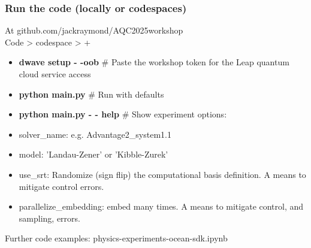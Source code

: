 \documentclass[aspectratio=169,final,11pt,forpublic]{beamer} %
\begin{document}
%
%  
%
%        



\begin{frame}\frametitle{\bf Run the code (locally or codespaces)}
  At github.com/jackraymond/AQC2025workshop \\
  Code > codespace > +\\
  \begin{itemize}
    \item[] {\bf dwave setup - -oob}  \# Paste the workshop token for the Leap quantum cloud service access
    \item[] {\bf python main.py}  \# Run with defaults
    \item[] {\bf python main.py - - help}  \# Show experiment options:
  \end{itemize}

  \begin{itemize}
  \item solver\_name: e.g. Advantage2\_system1.1
  \item model: 'Landau-Zener' or 'Kibble-Zurek'
  \item use\_srt: Randomize (sign flip) the computational basis definition. A means to mitigate control errors.
  \item parallelize\_embedding: embed many times. A means to mitigate control, and sampling, errors. 
  \end{itemize}
  Further code examples: physics-experiments-ocean-sdk.ipynb
\end{frame}
  
\end{document}
